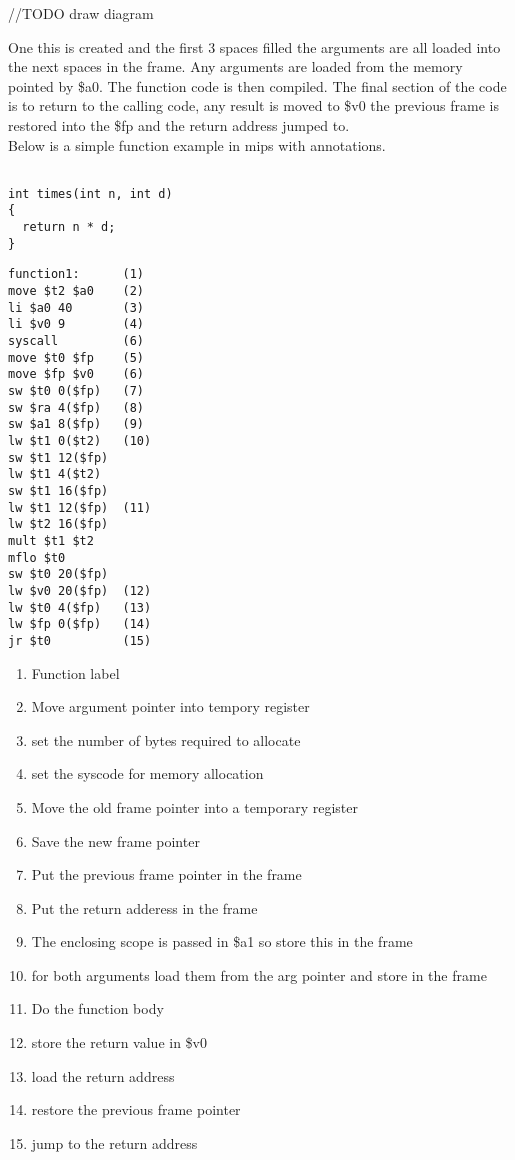 \documentclass{article}
\begin{document}
//TODO draw diagram

One this is created and the first 3 spaces filled the arguments are all loaded
into the next spaces in the frame. Any arguments are loaded from the memory pointed
by \$a0. The function code is then compiled. The final
section of the code is to return to the calling code, any result is moved to \$v0
the previous frame is restored into the \$fp and the return address jumped to.\\
Below is a simple function example in mips with annotations.

\begin{minipage}{0.4\textwidth}
\begin{lstlisting}

int times(int n, int d)
{
  return n * d;
}

\end{lstlisting}
\end{minipage}%
\begin{minipage}{0.6\textwidth}
\begin{lstlisting}
function1:      (1)
move $t2 $a0    (2)
li $a0 40       (3)
li $v0 9        (4)
syscall         (6)
move $t0 $fp    (5)
move $fp $v0    (6)
sw $t0 0($fp)   (7)
sw $ra 4($fp)   (8)
sw $a1 8($fp)   (9)
lw $t1 0($t2)   (10)
sw $t1 12($fp)
lw $t1 4($t2)
sw $t1 16($fp)
lw $t1 12($fp)  (11)
lw $t2 16($fp)
mult $t1 $t2
mflo $t0
sw $t0 20($fp)
lw $v0 20($fp)  (12)
lw $t0 4($fp)   (13)
lw $fp 0($fp)   (14)
jr $t0          (15)
\end{lstlisting}
\end{minipage}%

\begin{enumerate}
\item Function label
\item Move argument pointer into tempory register
\item set the number of bytes required to allocate
\item set the syscode for memory allocation
\item Move the old frame pointer into a temporary register
\item Save the new frame pointer
\item Put the previous frame pointer in the frame
\item Put the return adderess in the frame
\item The enclosing scope is passed in \$a1 so store this in the frame
\item for both arguments load them from the arg pointer and store in the frame
\item Do the function body
\item store the return value in \$v0
\item load the return address
\item restore the previous frame pointer
\item jump to the return address
\end{enumerate}
\end{document}
